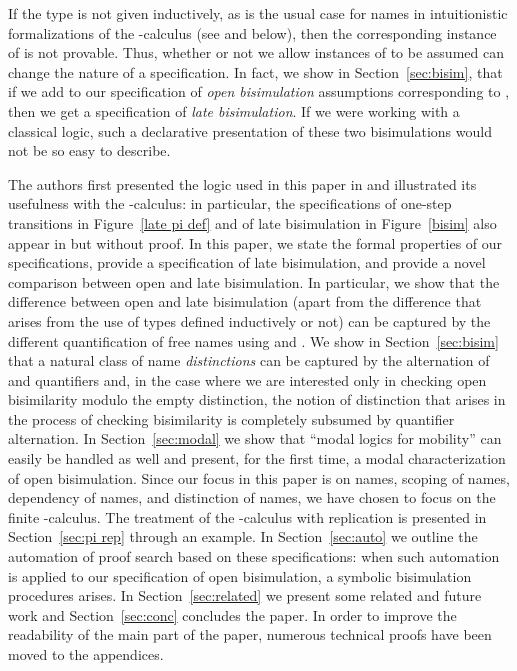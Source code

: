 \documentclass{acmtrans2m}
\begin{document}
If the type  is not given inductively, as is the usual case
for names in intuitionistic formalizations of the -calculus (see
\cite{despeyroux00ifiptcs} and below), then
the corresponding instance of  is not provable.
Thus, whether or not
we allow instances of  to be assumed can change the nature
of a specification.  In fact, we show in Section~\ref{sec:bisim},
that if we add to our specification of {\em open bisimulation}
\cite{sangiorgi96acta} assumptions corresponding to , then we get
a specification of {\em late bisimulation}.  If we were working with a
classical logic, such a declarative presentation of these two
bisimulations would not be so easy to describe.  

The authors first presented the logic used in this paper in
\cite{miller03lics} and illustrated its usefulness with the
-calculus: in particular, the specifications of one-step
transitions in Figure~\ref{late pi def} and of late bisimulation in
Figure~\ref{bisim} also appear in \cite{miller03lics} but without
proof.  In this paper, we state the formal properties of our specifications,
provide a specification of late bisimulation, and provide a novel
comparison between open and late bisimulation.
In particular, we show that the difference between open and late
bisimulation (apart from the difference that arises from the use of
types defined inductively or not) can be captured by the different
quantification of free names using  and .
We show in Section~\ref{sec:bisim} that a natural class of name {\em
distinctions} can be captured by the alternation of  and
 quantifiers and, in the case where we are interested only in
checking open bisimilarity modulo the empty distinction, the notion of
distinction that arises in the process of checking bisimilarity is
completely subsumed by quantifier alternation.
In Section~\ref{sec:modal} we show that ``modal logics
for mobility'' can easily be handled as well and present, for the
first time, a modal characterization of open bisimulation.  Since our
focus in this paper is on names, scoping of names, dependency of
names, and distinction of names, we have chosen to focus on the finite
-calculus.  The treatment of the -calculus with replication is
presented in Section~\ref{sec:pi rep} through an example.  In
Section~\ref{sec:auto} we outline the automation of proof search based
on these specifications: when such automation is applied to our
specification of open bisimulation, a symbolic bisimulation
procedures arises.  In Section~\ref{sec:related} we present some related and
future work and Section~\ref{sec:conc} concludes the paper. 
In order to improve the readability of the main part of the paper, 
numerous technical proofs have been moved to the appendices.
\end{document}
